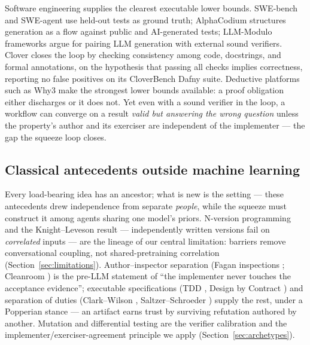 \documentclass[11pt]{article}
\begin{document}
Software engineering supplies the clearest executable lower bounds. SWE-bench and SWE-agent
\citep{jimenez2023swebench,yang2024sweagent} use held-out tests as ground truth; AlphaCodium
\citep{ridnik2024alphacodium} structures generation as a flow against public and AI-generated
tests; LLM-Modulo frameworks \citep{kambhampati2024position} argue for pairing LLM generation
with external sound verifiers. Clover \citep{sun2023clover} closes the loop by checking
consistency among code, docstrings, and formal annotations, on the hypothesis that passing all
checks implies correctness, reporting no false positives on its CloverBench Dafny suite.
Deductive platforms such as Why3 \citep{filliatre2013why3} make the strongest lower bounds
available: a proof obligation either discharges or it does not. Yet even with a sound verifier in
the loop, a workflow can converge on a result \emph{valid but answering the wrong question}
unless the property's author and its exerciser are independent of the implementer --- the gap the
squeeze loop closes.

\subsection{Classical antecedents outside machine learning}

Every load-bearing idea has an ancestor; what is new is the setting --- these antecedents drew
independence from separate \emph{people}, while the squeeze must construct it among agents sharing one
model's priors. N-version programming \citep{avizienis1985nversion} and the Knight--Leveson result
\citep{knight1986independence} --- independently written versions fail on \emph{correlated} inputs --- are
the lineage of our central limitation: barriers remove conversational coupling, not shared-pretraining
correlation (Section~\ref{sec:limitations}). Author--inspector separation (Fagan inspections
\citep{fagan1976inspections}; Cleanroom \citep{mills1987cleanroom}) is the pre-LLM statement of ``the
implementer never touches the acceptance evidence''; executable specifications (TDD \citep{beck2003tdd},
Design by Contract \citep{meyer1992contract}) and separation of duties (Clark--Wilson
\citep{clark1987comparison}, Saltzer--Schroeder \citep{saltzer1975protection}) supply the rest, under a
Popperian stance \citep{popper1959logic} --- an artifact earns trust by surviving refutation authored by
another. Mutation \citep{demillo1978hints,jia2011analysis} and differential testing
\citep{mckeeman1998differential} are the verifier calibration and the implementer/exerciser-agreement
principle we apply (Section~\ref{sec:archetypes}).
\end{document}
